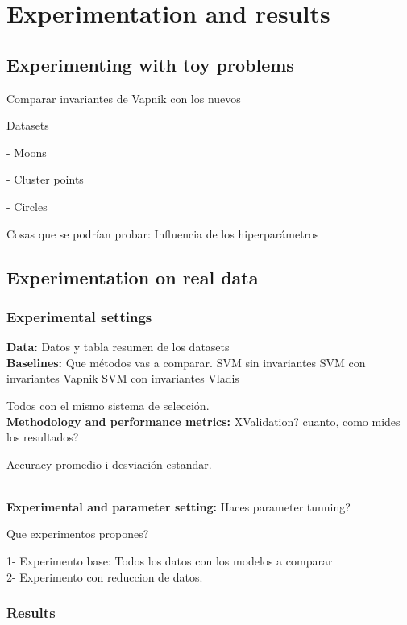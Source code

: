 
\chapter{Experimentation and results} %
\label{Chapter4}

\label{ChapterX} %

\section{Experimenting with toy problems}

Comparar invariantes de Vapnik con los nuevos

Datasets

- Moons

- Cluster points

- Circles


Cosas que se podrían probar: Influencia de los hiperparámetros


\section{Experimentation on real data}
\subsection{Experimental settings}
{\bf Data:} Datos y tabla resumen de los datasets\\
{\bf Baselines:} Que métodos vas a comparar.
SVM sin invariantes
SVM con invariantes Vapnik
SVM con invariantes Vladis

Todos con el mismo sistema de selección.
\\
{\bf Methodology and performance metrics:} XValidation? cuanto, como mides los resultados?

Accuracy promedio i desviación estandar.



\\
{\bf Experimental and parameter setting:}
Haces parameter tunning?

Que experimentos propones?

1- Experimento base: Todos los datos con los modelos a comparar\\
2- Experimento con reduccion de datos.


\subsection{Results}
